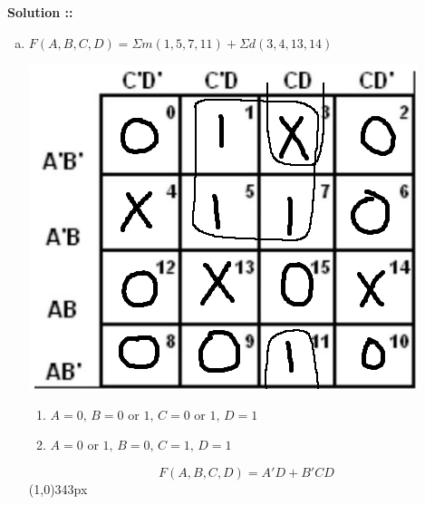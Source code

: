 \documentclass[11pt]{article}
\begin{document}
\vspace{5px}\textbf{Solution ::}
\begin{enumerate}[a)]
    \item 
    $F(A,B,C,D) = \Sigma m(1,5,7,11) + \Sigma d(3,4,13,14)$
    \vspace{-15pt}\begin{center}
        \includegraphics[scale=0.35]{3a.png}
    \end{center}
    \vspace{-20pt}\begin{enumerate}[$\bullet$]
        \item $A = 0,\, B = 0$ or $1,\, C = 0$ or $1,\, D = 1$
        \item \vspace{-5pt}$A = 0$ or $1,\, B = 0,\, C = 1,\, D = 1$
    \end{enumerate}
    $$F(A,B,C,D) = A'D + B'CD$$
    \line(1,0){343px}


\end{enumerate}
\end{document}
